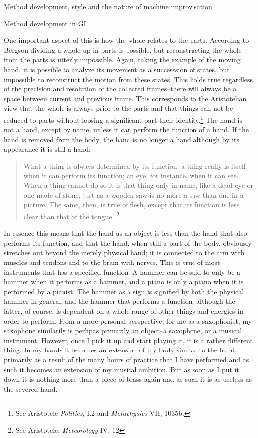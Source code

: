 \documentclass[presentation]{beamer}
\begin{document}
\begin{frame}[label={sec:org08c5441}]{Method development, style and the nature of machine improvisation}
\begin{block}{Method development in GI}
{{One important aspect of this is how the whole relates to the parts. According to Bergson dividing a whole up in parts is possible, but reconstructing the whole from the parts is utterly impossible. Again, taking the example of the moving hand, it is possible to analyze its movement as a successsion of states, but impossible to reconstruct the motion from these states. This holds true regardless of the precision and resolution of the collected frames--there will always be a space between current and previous frame. This corresponds to the Aristotelian view that the whole is always prior to the parts and that things can not be reduced to parts without loosing a significant part their identity.\footnote{See Aristotele \emph{Politics}, \RN{1}.2 and \emph{Metaphysics} \RN{7}, 1035b.} The hand is not a hand, except by name, unless it can perform the function of a hand. If the hand is removed from the body, the hand is no longer a hand although by its appearance it is still a hand:

\begin{quote}
What a thing is always determined by its function: a thing really is itself when it can perform its function; an eye, for instance, when it can see. When a thing cannot do so it is that thing only in name, like a dead eye or one made of stone, just as a wooden saw is no more a saw than one in a picture. The same, then, is true of flesh, except that its function is less clear than that of the tongue. \footnote{See Aristotele, \emph{Meteorology} IV, 12}
\end{quote}

In essence this means that the hand as an object is less than the hand that also performs its function, and that the hand, when still a part of the body, obviously stretches out beyond the merely physical hand; it is connected to the arm with muscles and tendons and to the brain with nerves. This is true of most instruments that has a specified function. A hammer can be said to only be a hammer when it performs as a hammer, and a piano is only a piano when it is performed by a pianist. The hammer as a sign is signified by both the physical hammer in general, and the hammer that performs a function, although the latter, of course, is dependent on a whole range of other things and energies in order to perform. From a more personal perspective, for me as a saxophonist, my saxophone similarily is perhpas primarily an object--a saxophone, or a musical instrument. However, once I pick it up and start playing it, it is a rather different thing. In my hands it becomes an extension of my body similar to the hand, primarily as a result of the many hours of practice that I have performed and as such it becomes an extension of my musical ambition. But as soon as I put it down it is nothing more than a piece of brass again and as such it is as useless as the severed hand.

}}
\end{block}
\end{frame}
\end{document}
